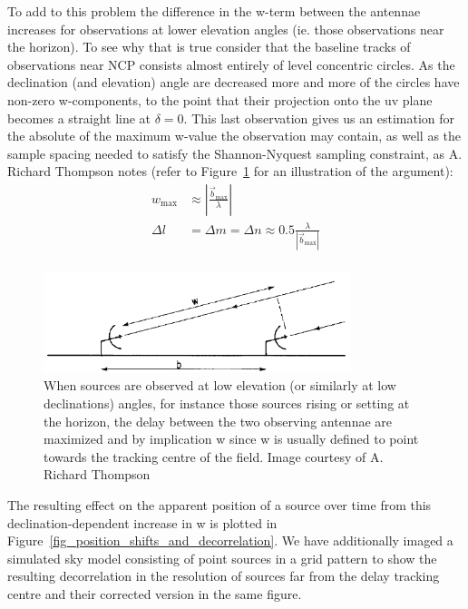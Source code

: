To add to this problem the difference in the w-term between the antennae increases for observations at lower elevation angles (ie. those observations near the horizon). To see why that
is true consider that the baseline tracks of observations near NCP consists almost entirely of level concentric circles. As the declination (and elevation) angle are decreased 
more and more of the circles have non-zero w-components, to the point that their projection onto the uv plane becomes a straight line at $\delta=0$. This last observation
gives us an estimation for the absolute of the maximum w-value the observation may contain, as well as the sample spacing needed to satisfy the Shannon-Nyquest sampling constraint, 
as A. Richard Thompson \cite[Lecture 2]{taylor1999synthesis} notes (refer to Figure~\ref{fig_max_baseline} for an illustration of the argument):
\begin{equation}
 \label{eqn_wmax}
 \begin{split}
  w_{\text{max}} &\approx |\frac{\vec{b}_{\text{max}}}{\lambda}|\\
  \Delta{l} &= \Delta{m} = \Delta{n} \approx 0.5\frac{\lambda}{|\vec{b}_{\text{max}}|}\\
 \end{split}
\end{equation}

\begin{figure}[h!]
  \begin{mdframed}
    \centering
    \includegraphics[width=0.8\textwidth]{images/max_w.png}
    \caption[Maximum w-estimation at low azimuth angle observation]{When sources are observed at low elevation (or similarly at low declinations) angles,
    for instance those sources rising or setting at the horizon, the delay between the two observing antennae are maximized and by implication w since w is usually
    defined to point towards the tracking centre of the field. Image courtesy of A. Richard Thompson \cite[Lecture 2]{taylor1999synthesis}}
    \label{fig_max_baseline}
  \end{mdframed}
\end{figure}

The resulting effect on the apparent position of a source over time from this declination-dependent increase in w is plotted in Figure~\ref{fig_position_shifts_and_decorrelation}. We have 
additionally imaged a simulated sky model consisting of point sources in a grid pattern to show the resulting decorrelation in the resolution of sources far from the delay tracking centre 
and their corrected version in the same figure.

